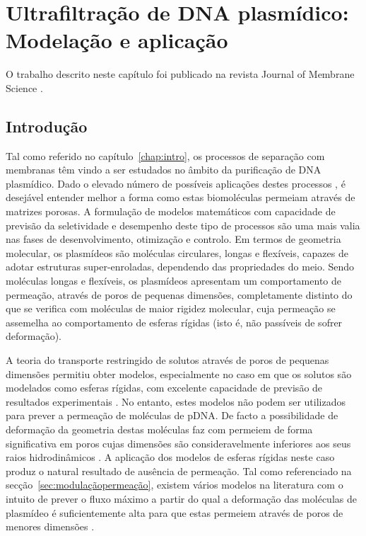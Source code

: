 \chapter{Ultrafiltração de DNA plasmídico: Modelação e aplicação}
\label{chap:art2}
O trabalho descrito neste capítulo foi publicado na revista Journal of Membrane Science \cite{meu2}.
%

\section{Introdução}
Tal como referido no capítulo~\ref{chap:intro}, os processos de separação com membranas têm vindo a ser estudados no âmbito da purificação de \mbox{DNA} plasmídico. Dado o elevado número de possíveis aplicações destes processos \cite{rathore}, é desejável entender melhor a forma como estas biomoléculas permeiam através de matrizes porosas. A formulação de modelos matemáticos com capacidade de previsão da seletividade e desempenho deste tipo de processos são uma mais valia nas fases de desenvolvimento, otimização e controlo. Em termos de geometria molecular, os plasmídeos são moléculas circulares, longas e flexíveis, capazes de adotar estruturas super-enroladas, dependendo das propriedades do meio.
%
Sendo moléculas longas e flexíveis, os plasmídeos apresentam um comportamento de permeação, através de poros de pequenas dimensões, completamente distinto do que se verifica com moléculas de maior rigidez molecular, cuja permeação se assemelha ao comportamento de esferas rígidas (isto é, não passíveis de sofrer deformação).

%
A teoria do transporte restringido de solutos através de poros de pequenas dimensões permitiu obter modelos, especialmente no caso em que os solutos são modelados como esferas rígidas, com excelente capacidade de previsão de resultados experimentais \cite{deen,dechadilok,moraompa}. No entanto, estes modelos não podem ser utilizados para prever a permeação de moléculas de \mbox{pDNA}. De facto a possibilidade de deformação da geometria destas moléculas faz com permeiem de forma significativa em poros cujas dimensões são consideravelmente inferiores aos seus raios hidrodinâmicos \cite{kong10,latu07,latu09,ark11}. A aplicação dos modelos de esferas rígidas neste caso produz o natural resultado de ausência de permeação. Tal como referenciado na secção~\ref{sec:modulaçãopermeação}, existem vários modelos na literatura com o intuito de prever o fluxo máximo a partir do qual a deformação das moléculas de plasmídeo é suficientemente alta para que estas permeiem através de poros de menores dimensões \cite{latu07,latu09,ager,daoudi}.

